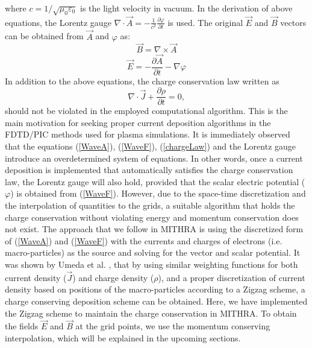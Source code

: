 %
where $c=1/\sqrt{\mu_0 \varepsilon_0}$ is the light velocity in vacuum.
%
In the derivation of above equations, the Lorentz gauge $\nabla \cdot \vec{A}=-\frac{1}{c^2}\frac{\partial \varphi}{\partial t}$ is used. %
%
The original $\vec{E}$ and $\vec{B}$ vectors can be obtained from $\vec{A}$ and $\varphi$ as:
%
\begin{equation}
\label{BvsA}
\vec{B} = \nabla \times \vec{A}
\end{equation}
%
\begin{equation}
\label{EvsA}
\vec{E} = -\frac{\partial \vec{A}}{\partial t}-\nabla \varphi
\end{equation}
%
In addition to the above equations, the charge conservation law written as
%
\begin{equation}
\label{chargeLaw}
\nabla \cdot \vec{J} + \frac{\partial \rho}{\partial t} = 0,
\end{equation}
should not be violated in the employed computational algorithm.
%
This is the main motivation for seeking proper current deposition algorithms in the FDTD/PIC methods used for plasma simulations.
%
It is immediately observed that the equations (\ref{WaveA}), (\ref{WaveF}), (\ref{chargeLaw}) and the Lorentz gauge introduce an overdetermined system of equations.
%
In other words, once a current deposition is implemented that automatically satisfies the charge conservation law, the Lorentz gauge will also hold, provided that the scalar electric potential ($\varphi$) is obtained from (\ref{WaveF}).
%
However, due to the space-time discretization and the interpolation of quantities to the grids, a suitable algorithm that holds the charge conservation without violating energy and momentum conservation does not exist.
%
The approach that we follow in MITHRA is using the discretized form of (\ref{WaveA}) and (\ref{WaveF}) with the currents and charges of electrons (i.e. macro-particles) as the source and solving for the vector and scalar potential.
%
It was shown by Umeda et al. \cite{umeda2003new}, that by using similar weighting functions for both current density ($\vec{J}$) and charge density ($\rho$), and a proper discretization of current density based on positions of the macro-particles according to a Zigzag scheme, a charge conserving deposition scheme can be obtained.
%
Here, we have implemented the Zigzag scheme to maintain the charge conservation in MITHRA.
%
To obtain the fields $\vec{E}$ and $\vec{B}$ at the grid points, we use the momentum conserving interpolation, which will be explained in the upcoming sections.

